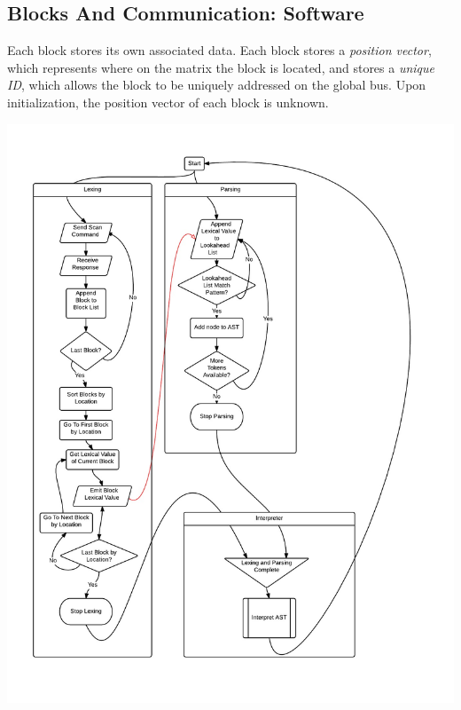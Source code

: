   \subsection{Blocks And Communication: Software}
    Each block stores its own associated data. Each block stores a \textit{position vector}, which represents where on the matrix the block is located, and stores a \textit{unique ID}, which allows the block to be uniquely addressed on the global bus. Upon initialization, the position vector of each block is unknown.
   
    \includegraphics[width=6in]{central_processor_stages}


